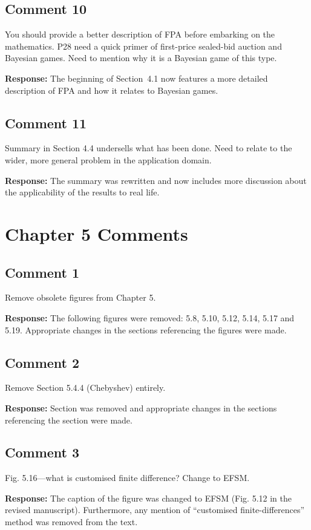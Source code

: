 \documentclass[10pt,a4paper,notitlepage]{article}
\numberwithin{equation}{section}
\begin{document}
\subsection{Comment 10}
You should provide a better description of FPA before embarking on the mathematics. P28 need a quick primer of first-price sealed-bid auction and Bayesian games. Need to mention why it is a Bayesian game of this type.

\textbf{Response:}
The beginning of Section~4.1 now features a more detailed description of FPA and how it relates to Bayesian games.

\subsection{Comment 11}
Summary in Section 4.4 undersells what has been done. Need to relate to the wider, more general problem in the application domain.

\textbf{Response:}
The summary was rewritten and now includes more discussion about the applicability of the results to real life.

\clearpage

\section{Chapter 5 Comments}
\subsection{Comment 1}
Remove obsolete figures from Chapter 5.

\textbf{Response:}
The following figures were removed: 5.8, 5.10, 5.12, 5.14, 5.17 and 5.19. Appropriate changes in the sections referencing the figures were made.

\subsection{Comment 2}
Remove Section 5.4.4 (Chebyshev) entirely.

\textbf{Response:}
Section was removed and appropriate changes in the sections referencing the section were made.

\subsection{Comment 3}
Fig. 5.16---what is customised finite difference? Change to EFSM.

\textbf{Response:}
The caption of the figure was changed to EFSM (Fig. 5.12 in the revised manuscript). Furthermore, any mention of ``customised finite-differences'' method was removed from the text.
\end{document}
